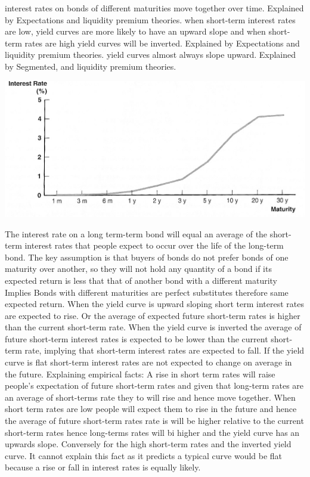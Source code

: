 \documentclass[12pt]{examnotes}
\begin{document}
 interest rates on bonds of different maturities move together over time. Explained by Expectations and liquidity premium theories.
 when short-term interest rates are low, yield curves are more likely to have an upward slope and when short-term rates are high yield curves will be inverted. Explained by Expectations and liquidity premium theories.
 yield curves almost always slope upward. Explained by Segmented, and liquidity premium theories.

\includegraphics[scale=0.3]{./imgs/65.jpg}

\ra The interest rate on a long term-term bond will equal an average of the short-term interest rates that people expect to occur over the life of the long-term bond. 
\ra The key assumption is that buyers of bonds do not prefer bonds of one maturity over another, so they will not hold any quantity of a bond if its expected return is less that that of another bond with a different maturity
\ra Implies Bonds with different maturities are perfect substitutes therefore same expected return. 
\ra When the yield curve is upward sloping short term interest rates are expected to rise. Or the average of expected future short-term rates is higher than the current short-term rate.
\ra When the yield curve is inverted the average of future short-term interest rates is expected to be lower than the current short-term rate, implying that short-term interest rates are expected to fall. 
\ra If the yield curve is flat short-term interest rates are not expected to change on average in the future.
\ra Explaining empirical facts:
 A rise in short term rates will raise people's expectation of future short-term rates and given that long-term rates are an average of short-terms rate they to will rise and hence move together.   When short term rates are low people will expect them to rise in the future and hence the average of future short-term rates rate is will be higher relative to the current short-term rates hence long-terms rates will bi higher and the yield curve has an upwards slope. Conversely for the high short-term rates and the inverted yield curve. 
 It cannot explain this fact as it predicts a typical curve would be flat because a rise or fall in interest rates is equally likely.
\end{document}
